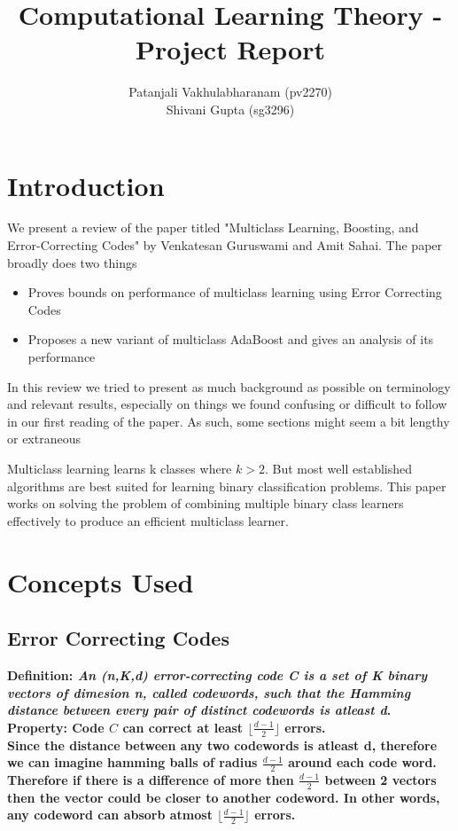 \documentclass[11pt]{article}
\title{Computational Learning Theory - Project Report}
\author{Patanjali Vakhulabharanam (pv2270)\\ Shivani Gupta (sg3296)}
\begin{document}
\maketitle

\section{Introduction}
    We present a review of the paper \cite{Guruswami:1999:MLB:307400.307429} titled "Multiclass Learning, Boosting, and Error-Correcting Codes" by Venkatesan Guruswami and Amit Sahai. The paper broadly does two things
    \begin{itemize}
    \item Proves bounds on performance of multiclass learning using Error Correcting Codes
    \item Proposes a new variant of multiclass AdaBoost and gives an analysis of its performance
    \end{itemize}
    In this review we tried to present as much background as possible on terminology and relevant results, especially on things we found confusing or difficult to follow in our first reading of the paper. As such, some sections might seem a bit lengthy or extraneous
    
	Multiclass learning learns k classes where $k > 2$. But most well established algorithms are best suited for learning binary classification problems. This paper works on solving the problem of combining multiple binary class learners effectively to produce an efficient multiclass learner.
	
\section{Concepts Used}
    \subsection{Error Correcting Codes}
        \bf Definition: \normalfont \textit {An (n,K,d) error-correcting code C is a set of K binary vectors of dimesion n, called codewords, such that the Hamming distance between every pair of distinct codewords is atleast d}.\\
        \bf Property: Code $C$ can correct at least $\lfloor \frac{d-1}{2} \rfloor$ errors. \normalfont\\
        Since the distance between any two codewords is atleast d, therefore we can imagine hamming balls of radius $\frac{d-1}{2}$ around each code word. Therefore if there is a difference of more then $\frac{d-1}{2}$ between 2 vectors then the vector could be closer to another codeword. In other words, any codeword can absorb atmost  $\lfloor \frac{d-1}{2} \rfloor$ errors.\\
\end{document}
